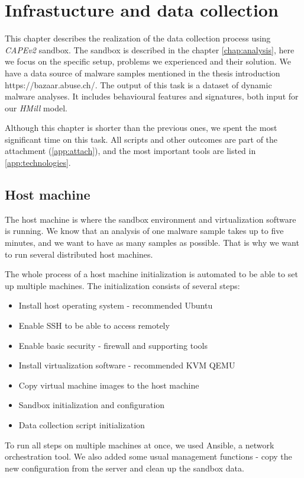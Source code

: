 \chapter{Infrastucture and data collection} \label{chap:infrastructure}
This chapter describes the realization of the data collection process using \emph{CAPEv2} sandbox. The sandbox is described in the chapter \ref{chap:analysis}, here we focus on the specific setup, problems we experienced and their solution. We have a data source of malware samples mentioned in the thesis introduction https://bazaar.abuse.ch/. The output of this task is a dataset of dynamic malware analyses. It includes behavioural features and signatures, both input for our \emph{HMill} model.

Although this chapter is shorter than the previous ones, we spent the most significant time on this task. All scripts and other outcomes are part of the attachment (\ref{app:attach}), and the most important tools are listed in \ref{app:technologies}.

\section{Host machine}
The host machine is where the sandbox environment and virtualization software is running. We know that an analysis of one malware sample takes up to five minutes, and we want to have as many samples as possible. That is why we want to run several distributed host machines. 

The whole process of a host machine initialization is automated to be able to set up multiple machines. The initialization consists of several steps:
\begin{itemize}
    \itemsep0em 
    \item Install host operating system - recommended Ubuntu
    \item Enable SSH to be able to access remotely
    \item Enable basic security - firewall and supporting tools
    \item Install virtualization software - recommended KVM QEMU
    \item Copy virtual machine images to the host machine
    \item Sandbox initialization and configuration
    \item Data collection script initialization
\end{itemize}

To run all steps on multiple machines at once, we used Ansible, a network orchestration tool. We also added some usual management functions - copy the new configuration from the server and clean up the sandbox data.

